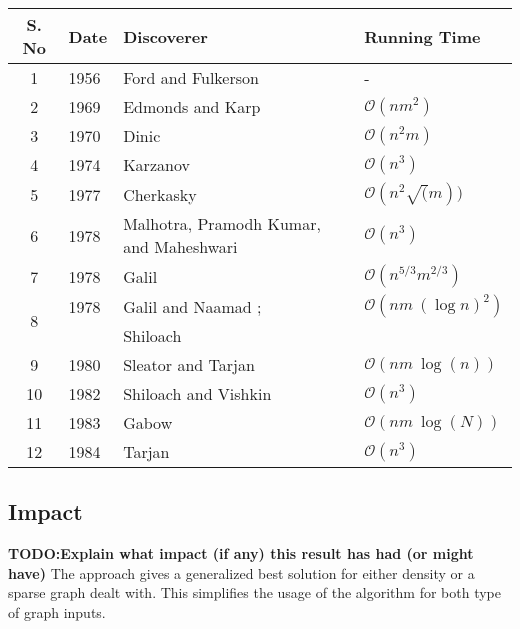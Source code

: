     \begin{center}
    \begin{tabular}{| c | l | p{5cm} | l | }
        \hline                       
        S. No & Date & Discoverer & Running Time \\
        \hline
        1 & 1956 & Ford and Fulkerson & - \\
        2 & 1969 & Edmonds and Karp \cite{Edmonds:1972:TIA:321694.321699} & $\mathcal{O}(nm^2)$ \\
        3 & 1970 & Dinic & $\mathcal{O}(n^2m)$ \\
        4 & 1974 & Karzanov & $\mathcal{O}(n^3)$ \\
        5 & 1977 & Cherkasky & $\mathcal{O}(n^2 \sqrt(m))$ \\
        6 & 1978 & Malhotra, Pramodh Kumar, and Maheshwari &
        $\mathcal{O}(n^3)$ \\
        7 & 1978 & Galil & $\mathcal{O}(n^{5/3}m^{2/3})$ \\
        \multirow{2}{*}{8} & 1978 & Galil and Naamad \cite{citeulike:1687675}; & $\mathcal{O}(nm\ {(\log n)}^2)$ \\
                           &      & Shiloach \cite{Shiloach:1978:OIL:892195} &   \\
        9 & 1980 & Sleator and Tarjan \cite{Sleator:1983:DSD:61337.61338} & $\mathcal{O}(nm\ \log(n))$ \\
        10 & 1982 & Shiloach and Vishkin \cite{Shiloach:1982:ONL:61335.61336} & $\mathcal{O}(n^3)$ \\
        11 & 1983 & Gabow \cite{Gabow:1985:SAN:5212.5260} & $\mathcal{O}(nm\ \log(N))$ \\
        12 & 1984 & Tarjan & $\mathcal{O}(n^3)$ \\
        \hline                       
    \end{tabular}
    \end{center}

\subsection*{Impact}
    \textbf{TODO:Explain what impact (if any) this result has had (or might have)}
    \newline
    The approach gives a generalized best solution for either density or a
    sparse graph dealt with. This simplifies the usage of the algorithm for
    both type of graph inputs.
%

